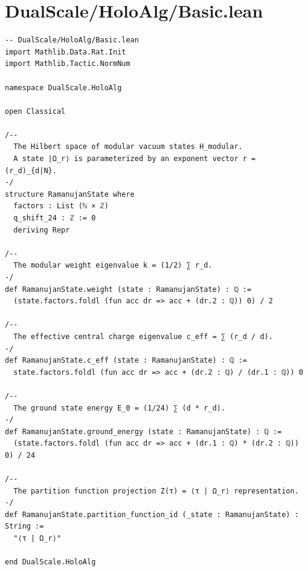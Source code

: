 \documentclass[11pt,twoside,openright]{book}
\begin{document}
\section{DualScale/HoloAlg/Basic.lean}
\begin{verbatim}
-- DualScale/HoloAlg/Basic.lean
import Mathlib.Data.Rat.Init
import Mathlib.Tactic.NormNum

namespace DualScale.HoloAlg

open Classical

/-- 
  The Hilbert space of modular vacuum states H_modular.
  A state |Ω_r⟩ is parameterized by an exponent vector r = (r_d)_{d|N}.
-/
structure RamanujanState where
  factors : List (ℕ × ℤ)
  q_shift_24 : ℤ := 0
  deriving Repr

/-- 
  The modular weight eigenvalue k = (1/2) ∑ r_d.
-/
def RamanujanState.weight (state : RamanujanState) : ℚ :=
  (state.factors.foldl (fun acc dr => acc + (dr.2 : ℚ)) 0) / 2

/-- 
  The effective central charge eigenvalue c_eff = ∑ (r_d / d).
-/
def RamanujanState.c_eff (state : RamanujanState) : ℚ :=
  state.factors.foldl (fun acc dr => acc + (dr.2 : ℚ) / (dr.1 : ℚ)) 0

/-- 
  The ground state energy E_0 = (1/24) ∑ (d * r_d).
-/
def RamanujanState.ground_energy (state : RamanujanState) : ℚ :=
  (state.factors.foldl (fun acc dr => acc + (dr.1 : ℚ) * (dr.2 : ℚ)) 0) / 24

/-- 
  The partition function projection Z(τ) = ⟨τ | Ω_r⟩ representation.
-/
def RamanujanState.partition_function_id (_state : RamanujanState) : String :=
  "⟨τ | Ω_r⟩"

end DualScale.HoloAlg

\end{verbatim}
\end{document}
